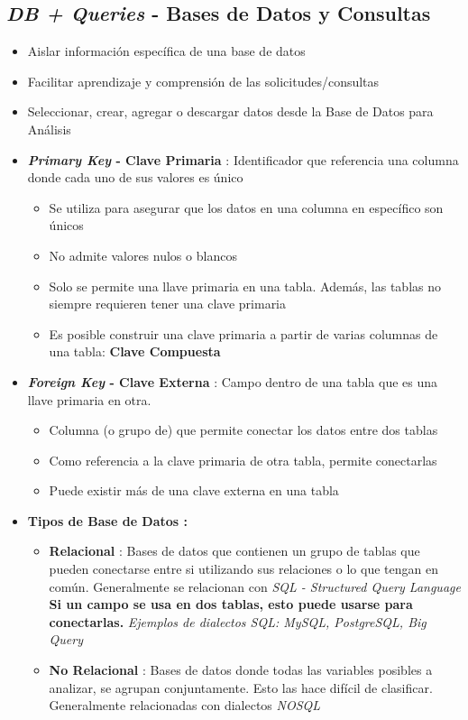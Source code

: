 \subsection{\textit{DB + Queries} - Bases de Datos y Consultas}
\begin{itemize}
    \item {Aislar información específica de una base de datos}
    \item {Facilitar aprendizaje y comprensión de las solicitudes/consultas}
    \item {Seleccionar, crear, agregar o descargar datos desde la Base de Datos para Análisis}
    \item {\textbf{\textit{Primary Key} - Clave Primaria} : Identificador que referencia una columna donde cada uno de sus valores es único
    \begin{itemize}
        \item {Se utiliza para asegurar que los datos en una columna en específico son únicos}
        \item {No admite valores nulos o blancos}
        \item {Solo se permite una llave primaria en una tabla. Además, las tablas no siempre requieren tener una clave primaria}
        \item {Es posible construir una clave primaria a partir de varias columnas de una tabla: \textbf{Clave Compuesta}}
    \end{itemize}}
    \item {\textbf{\textit{Foreign Key} - Clave Externa} : Campo dentro de una tabla que es una llave primaria en otra.
    \begin{itemize}
        \item {Columna (o grupo de) que permite conectar los datos entre dos tablas}
        \item {Como referencia a la clave primaria de otra tabla, permite conectarlas}
        \item {Puede existir más de una clave externa en una tabla}
    \end{itemize}}
    \item {\textbf{Tipos de Base de Datos : }
    \begin{itemize}
        \item {\textbf{Relacional} : Bases de datos que contienen un grupo de tablas que pueden conectarse entre si utilizando sus relaciones o lo que tengan en común. Generalmente se relacionan con \textit{SQL - Structured Query Language} \textbf{Si un campo se usa en dos tablas, esto puede usarse para conectarlas.} \textit{Ejemplos de dialectos SQL: MySQL, PostgreSQL, Big Query}}
        \item {\textbf{No Relacional} : Bases de datos donde todas las variables posibles a analizar, se agrupan conjuntamente. Esto las hace difícil de clasificar. Generalmente relacionadas con dialectos \textit{NOSQL}}
    \end{itemize}}
\end{itemize}

